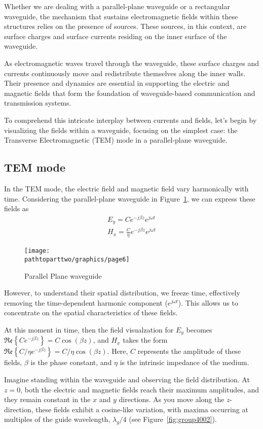 Whether we are dealing with a parallel-plane waveguide or a rectangular waveguide, the mechanism that sustains electromagnetic fields within these structures relies on the presence of sources. These sources, in this context, are surface charges and surface currents residing on the inner surface of the waveguide.

As electromagnetic waves travel through the waveguide, these surface charges and currents continuously move and redistribute themselves along the inner walls. Their presence and dynamics are essential in supporting the electric and magnetic fields that form the foundation of waveguide-based communication and transmission systems.

To comprehend this intricate interplay between currents and fields, let's begin by visualizing the fields within a waveguide, focusing on the simplest case: the Transverse Electromagnetic (TEM) mode in a parallel-plane waveguide.

\subsection{TEM mode}
In the TEM mode, the electric field and magnetic field vary harmonically with time. Considering the parallel-plane waveguide in Figure~\ref{fig:page6}, we can express these fields as
\begin{align*}
E_y = Ce^{-j\beta z}e^{j\omega t}\\
H_x = {\frac{C}{\eta}}e^{-j\beta z} e^{j\omega t}
\end{align*}
\begin{figure}[h]
\centering
\texttt{[image: \\pathtoparttwo/graphics/page6]}
\caption{Parallel Plane waveguide}
\label{fig:page6}
\end{figure}

However, to understand their spatial distribution, we freeze time, effectively removing the time-dependent harmonic component (\(e^{j\omega t}\)). This allows us to concentrate on the spatial characteristics of these fields.

At this moment in time, then the field visualzation for \(E_y\) becomes \({\mathfrak{Re}\left\{Ce^{-j\beta z}\right\}}= C \cos(\beta z)\), and \(H_x\) takes the form \({\mathfrak{Re}\left\{C/\eta e^{-j\beta z}\right\}} = C/\eta \cos(\beta z)\). Here, \(C\) represents the amplitude of these fields, \(\beta\) is the phase constant, and \(\eta\) is the intrinsic impedance of the medium.

Imagine standing within the waveguide and observing the field distribution. At \(z = 0\), both the electric and magnetic fields reach their maximum amplitudes, and they remain constant in the \(x\) and \(y\) directions. As you move along the \(z\)-direction, these fields exhibit a cosine-like variation, with maxima occurring at multiples of the guide wavelength, \(\lambda_g/4\) (see Figure~\ref{fig:group4002}).

